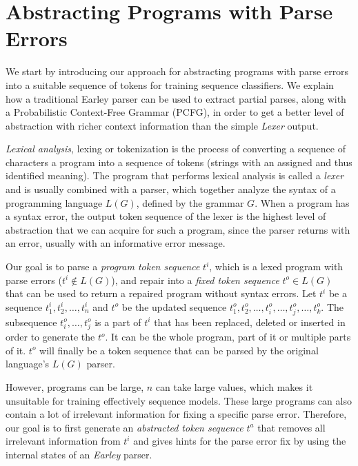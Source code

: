 \section{Abstracting Programs with Parse Errors}
\label{sec:prog-abstract}

We start by introducing our approach for abstracting programs with parse errors
into a suitable sequence of tokens for training sequence classifiers. We explain
how a traditional Earley parser can be used to extract partial parses, along
with a Probabilistic Context-Free Grammar (PCFG), in order to get a better level
of abstraction with richer context information than the simple \emph{Lexer}
output.



\emph{Lexical analysis}, lexing or tokenization is the process of converting a
sequence of characters \ie a program into a sequence of tokens (strings with an
assigned and thus identified meaning). The program that performs lexical
analysis is called a \emph{lexer} and is usually combined with a parser, which
together analyze the syntax of a programming language $L(G)$, defined by the
grammar $G$. When a program has a syntax error, the output token sequence of the
lexer is the highest level of abstraction that we can acquire for such a
program, since the parser returns with an error, usually with an informative
error message.

Our goal is to parse a \emph{program token sequence} $t^i$, which is a lexed
program with parse errors (\ie $t^i \notin L(G)$), and repair into a \emph{fixed
token sequence} $t^o \in L(G)$ that can be used to return a repaired program
without syntax errors. Let $t^i$ be a sequence $t^i_1, t^i_2, \dots, t^i_n$ and
$t^o$ be the updated sequence $t^o_1, t^o_2, \dots, t^o_i, \dots, t^o_j, \dots,
t^o_k$. The subsequence $t^o_i, \dots, t^o_j$ is a part of $t^i$ that has been
replaced, deleted or inserted in order to generate the $t^o$. It can be the
whole program, part of it or multiple parts of it. $t^o$ will finally be a token
sequence that can be parsed by the original language's $L(G)$ parser.

However, programs can be large, \ie $n$ can take large values, which makes it
unsuitable for training effectively sequence models. These large programs can
also contain a lot of irrelevant information for fixing a specific parse error.
Therefore, our goal is to first generate an \emph{abstracted token sequence}
$t^a$ that removes all irrelevant information from $t^i$ and gives hints for the
parse error fix by using the internal states of an \emph{Earley} parser.


